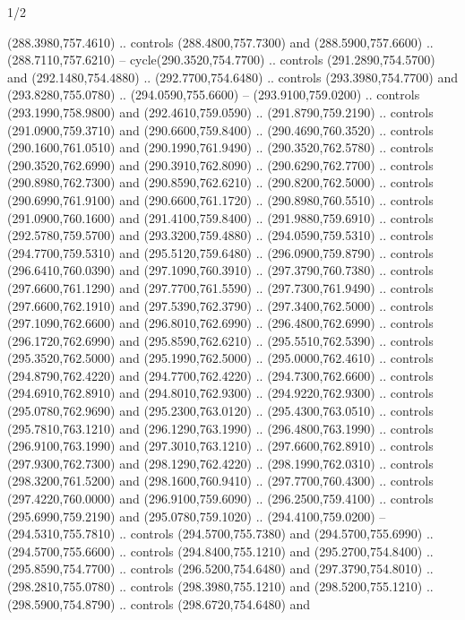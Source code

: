 \begin{flagdescription}{1/2}
\begin{scope}[xshift=0.5\flaglength]
\begin{scope}[scale=0.00745\flagwidth,xshift=-12.1mm,yshift=41.7mm]
\begin{scope}[y=0.80pt, x=0.80pt, yscale=-1, xscale=1, inner sep=0pt, outer sep=0pt]
\begin{scope}[cm={{1.33333,0.0,0.0,-1.33333,(0.0,114.66667)}}]
\begin{scope}[scale=0.100]
  (288.3980,757.4610) .. controls (288.4800,757.7300) and (288.5900,757.6600) ..
  (288.7110,757.6210) -- cycle(290.3520,754.7700) .. controls
  (291.2890,754.5700) and (292.1480,754.4880) .. (292.7700,754.6480) .. controls
  (293.3980,754.7700) and (293.8280,755.0780) .. (294.0590,755.6600) --
  (293.9100,759.0200) .. controls (293.1990,758.9800) and (292.4610,759.0590) ..
  (291.8790,759.2190) .. controls (291.0900,759.3710) and (290.6600,759.8400) ..
  (290.4690,760.3520) .. controls (290.1600,761.0510) and (290.1990,761.9490) ..
  (290.3520,762.5780) .. controls (290.3520,762.6990) and (290.3910,762.8090) ..
  (290.6290,762.7700) .. controls (290.8980,762.7300) and (290.8590,762.6210) ..
  (290.8200,762.5000) .. controls (290.6990,761.9100) and (290.6600,761.1720) ..
  (290.8980,760.5510) .. controls (291.0900,760.1600) and (291.4100,759.8400) ..
  (291.9880,759.6910) .. controls (292.5780,759.5700) and (293.3200,759.4880) ..
  (294.0590,759.5310) .. controls (294.7700,759.5310) and (295.5120,759.6480) ..
  (296.0900,759.8790) .. controls (296.6410,760.0390) and (297.1090,760.3910) ..
  (297.3790,760.7380) .. controls (297.6600,761.1290) and (297.7700,761.5590) ..
  (297.7300,761.9490) .. controls (297.6600,762.1910) and (297.5390,762.3790) ..
  (297.3400,762.5000) .. controls (297.1090,762.6600) and (296.8010,762.6990) ..
  (296.4800,762.6990) .. controls (296.1720,762.6990) and (295.8590,762.6210) ..
  (295.5510,762.5390) .. controls (295.3520,762.5000) and (295.1990,762.5000) ..
  (295.0000,762.4610) .. controls (294.8790,762.4220) and (294.7700,762.4220) ..
  (294.7300,762.6600) .. controls (294.6910,762.8910) and (294.8010,762.9300) ..
  (294.9220,762.9300) .. controls (295.0780,762.9690) and (295.2300,763.0120) ..
  (295.4300,763.0510) .. controls (295.7810,763.1210) and (296.1290,763.1990) ..
  (296.4800,763.1990) .. controls (296.9100,763.1990) and (297.3010,763.1210) ..
  (297.6600,762.8910) .. controls (297.9300,762.7300) and (298.1290,762.4220) ..
  (298.1990,762.0310) .. controls (298.3200,761.5200) and (298.1600,760.9410) ..
  (297.7700,760.4300) .. controls (297.4220,760.0000) and (296.9100,759.6090) ..
  (296.2500,759.4100) .. controls (295.6990,759.2190) and (295.0780,759.1020) ..
  (294.4100,759.0200) -- (294.5310,755.7810) .. controls (294.5700,755.7380) and
  (294.5700,755.6990) .. (294.5700,755.6600) .. controls (294.8400,755.1210) and
  (295.2700,754.8400) .. (295.8590,754.7700) .. controls (296.5200,754.6480) and
  (297.3790,754.8010) .. (298.2810,755.0780) .. controls (298.3980,755.1210) and
  (298.5200,755.1210) .. (298.5900,754.8790) .. controls (298.6720,754.6480) and

\end{scope}
\end{scope}
\end{scope}
\end{scope}
\end{scope}
\end{flagdescription}
